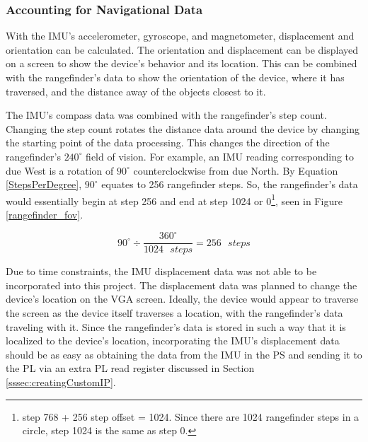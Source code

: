 \subsubsection{Accounting for Navigational Data}
With the IMU's accelerometer, gyroscope, and magnetometer, displacement and orientation can be calculated. The orientation and displacement can be displayed on a screen to show the device's behavior and its location. This can be combined with the rangefinder's data to show the orientation of the device, where it has traversed, and the distance away of the objects closest to it.
\par
The IMU's compass data was combined with the rangefinder's step count. Changing the step count rotates the distance data around the device by changing the starting point of the data processing. This changes the direction of the rangefinder's $240^\circ$ field of vision. For example, an IMU reading corresponding to due West is a rotation of $90^\circ$ counterclockwise from due North. By Equation \ref{StepsPerDegree}, $90^\circ$ equates to 256 rangefinder steps. So, the rangefinder's data would essentially begin at step 256 and end at step 1024 or 0\footnote{step 768 + 256 step offset = 1024. Since there are 1024 rangefinder steps in a circle, step 1024 is the same as step 0.}, seen in Figure \ref{rangefinder_fov}.

\begin{equation}
	90^\circ \div \dfrac{360^\circ}{1024 \textrm{ } steps}  = 256 \textrm{ } steps
	\label{StepsPerDegree}
\end{equation}

\par
Due to time constraints, the IMU displacement data was not able to be incorporated into this project. The displacement data was planned to change the device's location on the VGA screen. Ideally, the device would appear to traverse the screen as the device itself traverses a location, with the rangefinder's data traveling with it. Since the rangefinder's data is stored in such a way that it is localized to the device's location, incorporating the IMU's displacement data should be as easy as obtaining the data from the IMU in the PS and sending it to the PL via an extra PL read register discussed in Section \ref{sssec:creatingCustomIP}.



